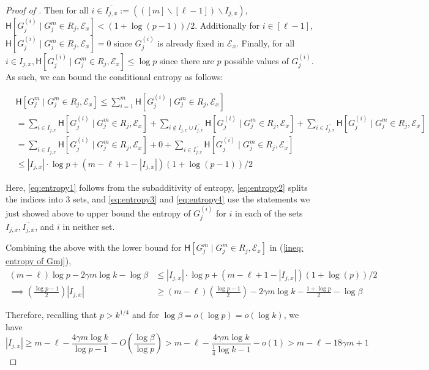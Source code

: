 \documentclass{toc}
\newcommand{\cond}{\;|\;}
\newcommand{\bigo}[1]{\ensuremath{{{O} \left( {#1} \right)}}}
\newcommand{\littleo}[1]{\ensuremath{{o \left( {#1} \right)}}}
\newcommand{\eqdef}{\ensuremath{:=}}
\newcommand{\entropy}{\ensuremath{\mathsf{H}}}
\newcommand{\event}{\ensuremath{\mathcal{E}}}
\begin{document}
\begin{proof}[Proof of ]
		
		Then for all $i\in \overline{I_{j,x}}\eqdef \left(([m]\backslash[\ell-1]) \backslash I_{j,x}\right)$, $\entropy[G_j^{(i)}\cond G_j^m\in R_j,\event_x ] < (1+\log(p-1))/2$. Additionally for $i\in [\ell-1]$, $\entropy[G_j^{(i)}\cond G_j^m\in R_j,\event_x ]=0$ since $G_j^{(i)}$ is already fixed in $\event_x$. {\color{black} Finally, for all $i \in I_{j,x}, \entropy[G_j^{(i)}\cond G_j^m\in R_j,\event_x ] \le \log p$ since there are $p$ possible values of $G_j^{(i)}$.} As such, we can bound the conditional entropy as follows:

		\begin{align}
			\label{eq:entropy1}&\entropy\left[ G^m_j \cond G^m_j\in R_j,\event_x \right]
			\le  \sum_{i=1}^{m} \entropy[G_j^{(i)}\cond G_j^m\in R_j,\event_x ]\\
			\label{eq:entropy2}&=  \sum_{i\in I_{j,x} } \entropy[G_j^{(i)}\cond G_j^m\in R_j,\event_x ] + \sum_{i \notin I_{j,x} \cup \overline{I_{j,x}}} \entropy[G_j^{(i)}\cond G_j^m\in R_j,\event_x ] + \sum_{i\in \overline{I_{j,x}}} \entropy[G_j^{(i)}\cond G_j^m\in R_j,\event_x ] \\
			\label{eq:entropy3}&= \sum_{i\in I_{j,x} } \entropy[G_j^{(i)}\cond G_j^m\in R_j,\event_x ] + 0 + \sum_{i\in \overline{I_{j,x}}} \entropy[G_j^{(i)}\cond G_j^m\in R_j,\event_x ] \\
			\label{eq:entropy4}&\le  |I_{j,x}| \cdot \log p + (m-\ell+1 - |I_{j,x}|)(1+\log(p-1))/2
		\end{align}
		
%
{\color{black}Here, \eqref{eq:entropy1} %
%
%
follows from
the  %
subadditivity of entropy, \eqref{eq:entropy2} splits the indices into 3 sets, and \eqref{eq:entropy3} and \eqref{eq:entropy4} use the statements we just showed above to upper bound the entropy of $G_j^{(i)}$ for $i$ in %
%
each of the %
sets $I_{j,x}, \overline{I_{j,x}}$, and $i$ in neither set.}
		
Combining the above with  the lower bound for $\entropy\left[ G^m_j \cond G^m_j\in R_j,\event_x \right]$ in (\ref{ineq: entropy of Gmj}), 
		\begin{align*}
			 (m-\ell)\log p - 2\gamma m\log k - \log \beta & \le |I_{j,x}| \cdot \log p + (m-\ell+1 - |I_{j,x}|)(1+\log(p))/2\\
			\implies \left( \frac{\log p -1}{2} \right) |I_{j,x}| & \ge  (m-\ell)\left(\frac{\log p -1}{2}\right)-2\gamma m\log k -\frac{1+\log p}{2} -\log \beta
		\end{align*}

		Therefore, recalling that $p> k^{1/4}$ 
		{and for $\log \beta =o(\log p)=o(\log k)$}, we have
		\[|I_{j,x}| \ge  m-\ell -\frac{4\gamma m \log k}{\log p-1} - \bigo{\frac{\log \beta}{\log p}}>m-\ell -\frac{4\gamma m \log k}{\frac{1}{4}\log k-1} - \littleo{1} >m-\ell - 18\gamma m + 1 \]
		

\end{proof}
\end{document}
